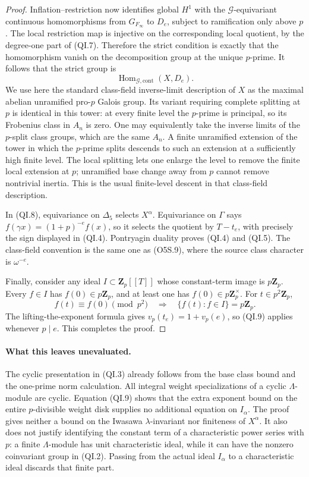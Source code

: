 \begin{proof}
Inflation--restriction now identifies global $H^1$ with the
$\mathcal G$-equivariant continuous homomorphisms from
$G_{F_\infty}$ to $D_e$, subject to ramification only above $p$.
The local restriction map is injective on the corresponding
local quotient, by the degree-one part of (QI.7).  Therefore the
strict condition is exactly that the homomorphism vanish on
the decomposition group at the unique $p$-prime.
It follows that the strict group is
\[
          \operatorname{Hom}_{\mathcal G,\mathrm{cont}}(X,D_e).
 \tag{QI.8}
\]
We use here the standard class-field inverse-limit description
of $X$ as the maximal abelian unramified pro-$p$ Galois group.
Its variant requiring complete splitting at $p$ is identical
in this tower: at every finite level the $p$-prime is principal,
so its Frobenius class in $A_n$ is zero.  One may equivalently
take the inverse limits of the $p$-split class groups, which
are the same $A_n$.  A finite unramified extension of the tower
in which the $p$-prime splits descends to such an extension at
a sufficiently high finite level.  The local splitting lets
one enlarge the level to remove the finite local extension
at $p$; unramified base change away from $p$ cannot remove
nontrivial inertia.  This is the usual finite-level descent
in that class-field description.

In (QI.8), equivariance on $\Delta_5$ selects $X^\alpha$.
Equivariance on $\Gamma$ says
$f(\gamma x)=(1+p)^{-e}f(x)$, so it selects the quotient by
$T-t_e$, with precisely the sign displayed in (QI.4).
Pontryagin duality proves (QI.4) and (QI.5).
The class-field convention is the same one as (O5S.9), where
the source class character is $\omega^{-e}$.

Finally, consider any ideal $I\subset\mathbf Z_p[[T]]$ whose
constant-term image is $p\mathbf Z_p$.  Every $f\in I$ has
$f(0)\in p\mathbf Z_p$, and at least one has
$f(0)\in p\mathbf Z_p^\times$.  For $t\in p^2\mathbf Z_p$,
\[
              f(t)\equiv f(0)\pmod {p^2}
              \quad\Longrightarrow\quad
              \{f(t):f\in I\}=p\mathbf Z_p.              \tag{QI.9}
\]
The lifting-the-exponent formula gives
$v_p(t_e)=1+v_p(e)$, so (QI.9) applies whenever $p\mid e$.
This completes the proof.
\end{proof}

\paragraph{What this leaves unevaluated.}
The cyclic presentation in (QI.3) already follows from the base
class bound and the one-prime norm calculation.  All integral
weight specializations of a cyclic $\Lambda$-module are cyclic.
Equation (QI.9) shows that the extra exponent bound on the entire
$p$-divisible weight disk supplies no additional equation on
$I_\alpha$.  The proof gives neither a bound on the Iwasawa
$\lambda$-invariant nor finiteness of $X^\alpha$.
It also does not justify identifying the constant term of a
characteristic power series with $p$: a finite $\Lambda$-module
has unit characteristic ideal, while it can have the nonzero
coinvariant group in (QI.2).  Passing from the actual ideal
$I_\alpha$ to a characteristic ideal discards that finite part.

